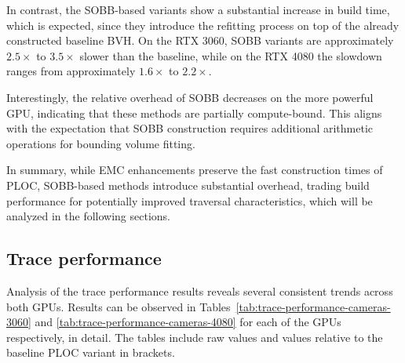 In contrast, the SOBB-based variants show a substantial increase in build time, which is expected, since they introduce the refitting process on top of the already constructed baseline BVH. On the RTX 3060, SOBB variants are approximately $2.5\times$ to $3.5\times$ slower than the baseline, while on the RTX 4080 the slowdown ranges from approximately $1.6\times$ to $2.2\times$. 

Interestingly, the relative overhead of SOBB decreases on the more powerful GPU, indicating that these methods are partially compute-bound. This aligns with the expectation that SOBB construction requires additional arithmetic operations for bounding volume fitting.

In summary, while EMC enhancements preserve the fast construction times of PLOC, SOBB-based methods introduce substantial overhead, trading build performance for potentially improved traversal characteristics, which will be analyzed in the following sections.

\subsection{Trace performance}
\label{sec:trace-performance}

Analysis of the trace performance results reveals several consistent trends across both GPUs. Results can be observed in Tables~\ref{tab:trace-performance-cameras-3060} and \ref{tab:trace-performance-cameras-4080} for each of the GPUs respectively, in detail. The tables include raw values and values relative to the baseline PLOC variant in brackets.

